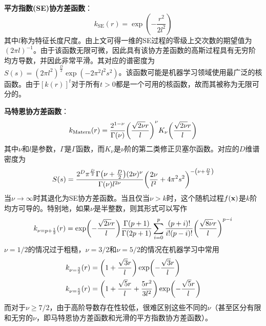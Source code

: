 \documentclass[12pt,UTF8]{article}
\begin{document}
                \textbf{平方指数(SE)协方差函数}：
                \begin{equation}
                    k_{\mathrm{SE}}(r)=\exp(-\frac{r^2}{2l^2})
                \end{equation}
                其中$l$称为特征长度尺度。由上文可得一维的SE过程的零级上交次数的期望值为$(2\pi l)^{-1}$。由于该函数无限可微，因此具有该协方差函数的高斯过程具有无穷阶均方导数，并因此非常平滑。其对应的谱密度为$S(s)=(2\pi l^2)^{\frac{D}{2}}\exp(-2\pi^2l^2s^2)$。该函数可能是机器学习领域使用最广泛的核函数。由于$[k(r)]^t$对于所有$t>0$都是一个可用的核函数，故而其被称为无限可分的。\par
                \textbf{马特恩协方差函数}：
                \begin{equation}
                    k_{\mathrm{Matern}}(r)=\frac{2^{1-\nu}}{\Gamma(\nu)}\qty(\frac{\sqrt{2\nu}r}{l})^{\nu}K_\nu\qty(\frac{\sqrt{2\nu}r}{l})
                \end{equation}
                其中$\nu$和$l$是参数，$\Gamma$是$\Gamma$函数，而$K_\nu$是$\nu$阶的第二类修正贝塞尔函数。对应的$D$维谱密度为
                \begin{equation}
                    S(s)=\frac{2^D\pi^{\frac{D}{2}}\Gamma\qty(\nu+\frac{D}{2})(2\nu)^{\nu}}{\Gamma(\nu)l^{2\nu}}\qty(\frac{2\nu}{l^2}+4\pi^2s^2)^{-\qty(\nu+\frac{D}{2})}
                \end{equation}
                当$\nu\rightarrow\infty$时其退化为SE协方差函数。当且仅当$\nu>k$时，这个随机过程$f(\vb{x})$是$k$阶均方可导的。特别地，如果$\nu$是半整数，则其形式可以写作
                \begin{equation}
                    k_{\nu=p+\frac{1}{2}}(r)=\exp(-\frac{\sqrt{2\nu}r}{l})\frac{\Gamma(p+1)}{\Gamma(2p+1)}\sum_{i=0}^p{\frac{(p+i)!}{i!(p-i)!}\qty(\frac{\sqrt{8\nu}r}{l})^{p-i}}
                \end{equation}
                $\nu=1/2$的情况过于粗糙，$\nu=3/2$和$\nu=5/2$的情况在机器学习中常用
                \begin{align}
                    &k_{\nu=\frac{3}{2}}(r)=\qty(1+\frac{\sqrt{3}r}{l})\exp(-\frac{\sqrt{3}r}{l}) \\
                    &k_{\nu=\frac{5}{2}}(r)=\qty(1+\frac{\sqrt{5}r}{l}+\frac{5r^2}{3l^2})\exp(-\frac{\sqrt{5}r}{l})
                \end{align}
                而对于$\nu\geqslant 7/2$，由于高阶导数存在性较低，很难区别这些不同的$\nu$（甚至区分有限和无穷的$\nu$，即马特恩协方差函数和光滑的平方指数协方差函数）。\par
\end{document}
